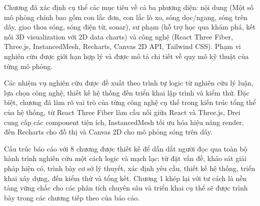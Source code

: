 Chương đã xác định cụ thể các mục tiêu về cả ba phương diện: nội dung (Một số mô phỏng chính bao gồm con lắc đơn, con lắc lò xo, sóng dọc/ngang, sóng trên dây, giao thoa sóng, sóng điện từ, sonar), sư phạm (hỗ trợ học qua khám phá, kết nối 3D visualization với 2D data charts) và công nghệ (React Three Fiber, Three.js, InstancedMesh, Recharts, Canvas 2D API, Tailwind CSS). Phạm vi nghiên cứu được giới hạn hợp lý và được mô tả chi tiết về quy mô kỹ thuật của từng mô phỏng.

Các nhiệm vụ nghiên cứu được đề xuất theo trình tự logic từ nghiên cứu lý luận, lựa chọn công nghệ, thiết kế hệ thống đến triển khai lập trình và kiểm thử. Đặc biệt, chương đã làm rõ vai trò của từng công nghệ cụ thể trong kiến trúc tổng thể của hệ thống, từ React Three Fiber làm cầu nối giữa React và Three.js, Drei cung cấp các component tiện ích, InstancedMesh tối ưu hóa hiệu năng render, đến Recharts cho đồ thị và Canvas 2D cho mô phỏng sóng trên dây.

Cấu trúc báo cáo với 8 chương được thiết kế để dẫn dắt người đọc qua toàn bộ hành trình nghiên cứu một cách logic và mạch lạc: từ đặt vấn đề, khảo sát giải pháp hiện có, trình bày cơ sở lý thuyết, xác định yêu cầu, thiết kế hệ thống, triển khai xây dựng, đến kiểm thử và tổng kết. Chương 1 khép lại với tư cách là nền tảng vững chắc cho các phân tích chuyên sâu và triển khai cụ thể sẽ được trình bày trong các chương tiếp theo của báo cáo.